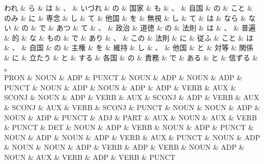 \documentclass[tikz,border=5pt]{standalone}
\begin{document}
\fontsize{5pt}{6pt}\selectfont
\begin{dependency}[edge unit distance=3.6pt]
    \begin{deptext}[column sep=0.3em]
        われ \& ら \& は \& 、 \& いづれ \& の \& 国家 \& も \& 、 \& 自国 \& の \& こと \& のみ \& に \& 専念 \& し \& て \& 他国 \& を \& 無視 \& し \& て \& は \& なら \& ない \& の \& で \& あつ \& て \& 、 \& 政治 \& 道徳 \& の \& 法則 \& は \& 、 \& 普遍 \& 的 \& な \& もの \& で \& あり \& 、 \& この \& 法則 \& に \& 従ふ \& こと \& は \& 、 \& 自国 \& の \& 主権 \& を \& 維持 \& し \& 、 \& 他国 \& と \& 対等 \& 関係 \& に \& 立たう \& と \& する \& 各国 \& の \& 責務 \& で \& ある \& と \& 信ずる \& 。\\
        PRON \& NOUN \& ADP \& PUNCT \& NOUN \& ADP \& NOUN \& ADP \& PUNCT \& NOUN \& ADP \& NOUN \& ADP \& ADP \& VERB \& AUX \& SCONJ \& NOUN \& ADP \& VERB \& AUX \& SCONJ \& ADP \& VERB \& AUX \& SCONJ \& AUX \& VERB \& SCONJ \& PUNCT \& NOUN \& NOUN \& ADP \& NOUN \& ADP \& PUNCT \& ADJ \& PART \& AUX \& NOUN \& AUX \& VERB \& PUNCT \& DET \& NOUN \& ADP \& VERB \& NOUN \& ADP \& PUNCT \& NOUN \& ADP \& NOUN \& ADP \& VERB \& AUX \& PUNCT \& NOUN \& ADP \& NOUN \& NOUN \& ADP \& VERB \& ADP \& VERB \& NOUN \& ADP \& NOUN \& AUX \& VERB \& ADP \& VERB \& PUNCT\\
    \end{deptext}

\end{dependency}
\end{document}
